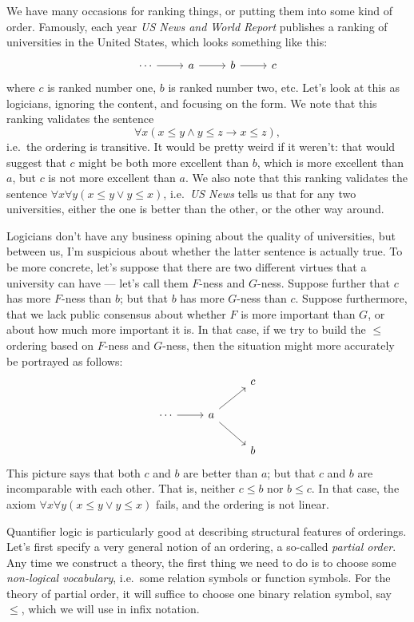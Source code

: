 We have many occasions for ranking things, or putting them into some
kind of order.  Famously, each year \textit{US News and World Report}
publishes a ranking of universities in the United States, which looks
something like this:
\[ \begin{tikzcd} \cdots \arrow{r} & a \arrow{r} & b \arrow{r} &
    c \end{tikzcd} \] where $c$ is ranked number one, $b$ is ranked
number two, etc.  Let's look at this as logicians, ignoring the
content, and focusing on the form.  We note that this ranking
validates the sentence
\[ \forall x(x\leq y\wedge y\leq z\to x\leq z) ,\] i.e.\ the ordering
is transitive.  It would be pretty weird if it weren't: that would
suggest that $c$ might be both more excellent than $b$, which is more
excellent than $a$, but $c$ is not more excellent than $a$.  We also
note that this ranking validates the sentence
$\forall x\forall y(x\leq y\vee y\leq x)$, i.e.\ \textit{US News}
tells us that for any two universities, either the one is better than
the other, or the other way around.

Logicians don't have any business opining about the quality of
universities, but between us, I'm suspicious about whether the latter
sentence is actually true.  To be more concrete, let's suppose that
there are two different virtues that a university can have --- let's
call them $F$-ness and $G$-ness.  Suppose further that $c$ has more
$F$-ness than $b$; but that $b$ has more $G$-ness than $c$.  Suppose
furthermore, that we lack public consensus about whether $F$ is more
important than $G$, or about how much more important it is.  In that
case, if we try to build the $\leq$ ordering based on $F$-ness and
$G$-ness, then the situation might more accurately be portrayed as
follows:
\[ \begin{tikzcd}
    &   & c \\
    \cdots \arrow{r} & a \arrow{ur} \arrow{dr} & \\
    & & b \end{tikzcd} \] This picture says that both $c$ and $b$ are
better than $a$; but that $c$ and $b$ are incomparable with each
other.  That is, neither $c\leq b$ nor $b\leq c$.  In that case, the
axiom $\forall x\forall y(x\leq y\vee y\leq x)$ fails, and the
ordering is not linear.

Quantifier logic is particularly good at describing structural
features of orderings.  Let's first specify a very general notion of
an ordering, a so-called \emph{partial order}.  Any time we construct
a theory, the first thing we need to do is to choose some
\emph{non-logical vocabulary}, i.e.\ some relation symbols or function
symbols.  For the theory of partial order, it will suffice to choose
one binary relation symbol, say $\leq$, which we will use in infix
notation.

